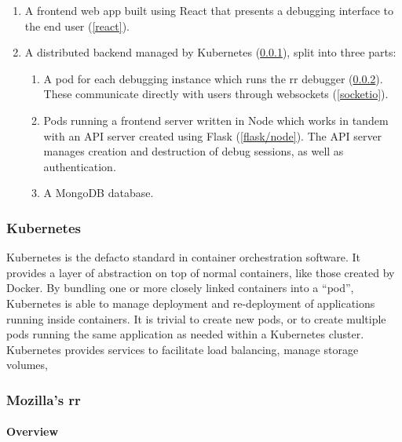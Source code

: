 \documentclass[12pt]{article}
\begin{document}
\begin{enumerate}
\item A frontend web app built using React that presents a debugging
  interface to the end user (\ref{react}).
\item A distributed backend managed by Kubernetes (\ref{k8s}), split into three parts:
  \begin{enumerate}
  \item A pod for each debugging instance which runs the rr debugger
    (\ref{rr}).  These communicate directly with users through
    websockets (\ref{socketio}).
  \item Pods running a frontend server written in Node which works in
    tandem with an API server created using Flask (\ref{flask/node}).
    The API server manages creation and destruction of debug sessions,
    as well as authentication.
  \item A MongoDB database.
  \end{enumerate}
\end{enumerate}

\subsubsection{Kubernetes}\label{k8s}

Kubernetes is the defacto standard in container orchestration
software.  It provides a layer of abstraction on top of normal
containers, like those created by Docker.  By bundling one or more
closely linked containers into a ``pod'', Kubernetes is able to manage
deployment and re-deployment of applications running inside
containers.  It is trivial to create new pods, or to create multiple
pods running the same application as needed within a Kubernetes
cluster.  Kubernetes provides services to facilitate load balancing,
manage storage volumes,

\subsubsection{Mozilla's rr}\label{rr}

\paragraph{Overview}
\end{document}
